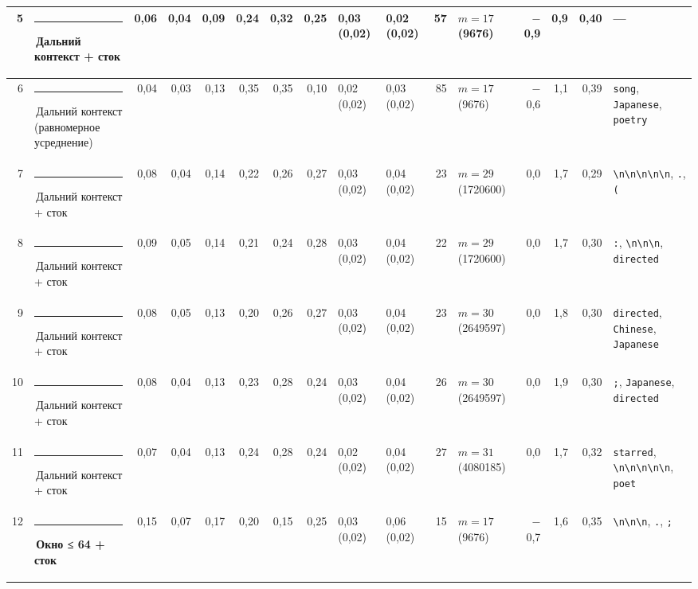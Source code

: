 \documentclass[10pt]{article}
\begin{document}
\begin{minipage}{\linewidth}
\begin{center}
{\begin{tabular}{|r|l|r|r|r|r|r|r|l|l|r|l|r|r|r|l|}
5 & \textcolor[HTML]{C3C2B7}{\rule{0.62em}{0.62em}}\,Дальний контекст + сток & 0,06 & 0,04 & 0,09 & 0,24 & 0,32 & 0,25 & 0,03 (0,02) & 0,02 (0,02) & 57 & $m{=}17$ (9676) & $-$0,9 & 0,9 & 0,40 & — \\ \hline
6 & \textcolor[HTML]{C3C2B7}{\rule{0.62em}{0.62em}}\,Дальний контекст (равномерное усреднение) & 0,04 & 0,03 & 0,13 & 0,35 & 0,35 & 0,10 & 0,02 (0,02) & 0,03 (0,02) & 85 & $m{=}17$ (9676) & $-$0,6 & 1,1 & 0,39 & \texttt{\textvisiblespace{}song}, \texttt{\textvisiblespace{}Japanese}, \texttt{\textvisiblespace{}poetry} \\ \hline
7 & \textcolor[HTML]{C3C2B7}{\rule{0.62em}{0.62em}}\,Дальний контекст + сток & 0,08 & 0,04 & 0,14 & 0,22 & 0,26 & 0,27 & 0,03 (0,02) & 0,04 (0,02) & 23 & $m{=}29$ (1720600) & 0,0 & 1,7 & 0,29 & \texttt{\textbackslash{}n\textbackslash{}n\textbackslash{}n\textbackslash{}n\textbackslash{}n}, \texttt{\textvisiblespace{}.}, \texttt{\textvisiblespace{}(} \\ \hline
8 & \textcolor[HTML]{C3C2B7}{\rule{0.62em}{0.62em}}\,Дальний контекст + сток & 0,09 & 0,05 & 0,14 & 0,21 & 0,24 & 0,28 & 0,03 (0,02) & 0,04 (0,02) & 22 & $m{=}29$ (1720600) & 0,0 & 1,7 & 0,30 & \texttt{\textvisiblespace{}:}, \texttt{\textvisiblespace{}\textbackslash{}n\textbackslash{}n\textbackslash{}n}, \texttt{\textvisiblespace{}directed} \\ \hline
9 & \textcolor[HTML]{C3C2B7}{\rule{0.62em}{0.62em}}\,Дальний контекст + сток & 0,08 & 0,05 & 0,13 & 0,20 & 0,26 & 0,27 & 0,03 (0,02) & 0,04 (0,02) & 23 & $m{=}30$ (2649597) & 0,0 & 1,8 & 0,30 & \texttt{\textvisiblespace{}directed}, \texttt{\textvisiblespace{}Chinese}, \texttt{\textvisiblespace{}Japanese} \\ \hline
10 & \textcolor[HTML]{C3C2B7}{\rule{0.62em}{0.62em}}\,Дальний контекст + сток & 0,08 & 0,04 & 0,13 & 0,23 & 0,28 & 0,24 & 0,03 (0,02) & 0,04 (0,02) & 26 & $m{=}30$ (2649597) & 0,0 & 1,9 & 0,30 & \texttt{\textvisiblespace{};}, \texttt{\textvisiblespace{}Japanese}, \texttt{\textvisiblespace{}directed} \\ \hline
11 & \textcolor[HTML]{C3C2B7}{\rule{0.62em}{0.62em}}\,Дальний контекст + сток & 0,07 & 0,04 & 0,13 & 0,24 & 0,28 & 0,24 & 0,02 (0,02) & 0,04 (0,02) & 27 & $m{=}31$ (4080185) & 0,0 & 1,7 & 0,32 & \texttt{\textvisiblespace{}starred}, \texttt{\textbackslash{}n\textbackslash{}n\textbackslash{}n\textbackslash{}n\textbackslash{}n}, \texttt{\textvisiblespace{}poet} \\ \hline
12 & \textcolor[HTML]{EDA100}{\rule{0.62em}{0.62em}}\,\textbf{Окно ≤ 64 + сток} & 0,15 & 0,07 & 0,17 & 0,20 & 0,15 & 0,25 & 0,03 (0,02) & 0,06 (0,02) & 15 & $m{=}17$ (9676) & $-$0,7 & 1,6 & 0,35 & \texttt{\textvisiblespace{}\textbackslash{}n\textbackslash{}n\textbackslash{}n}, \texttt{\textvisiblespace{}.}, \texttt{\textvisiblespace{};} \\ \hline

\end{tabular}}
\end{center}
\end{minipage}
\end{document}
